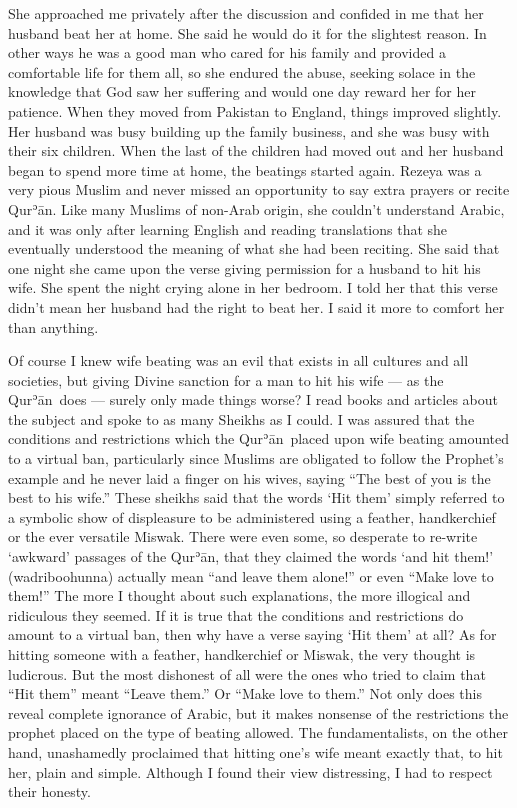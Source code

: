 \documentclass[12pt]{memoir}
\def\´{ʾ} %
\newcommand{\cor}[2]{#2} %
\def \Quran{Qur\-\´ān} %
\begin{document}
She approached me privately after the discussion
and confided in me that her husband beat her at home.
She said he would do it for the slightest reason.
In other ways he was a good man who cared for his family
and provided a comfortable life for them all, so she endured the abuse,
seeking solace in the knowledge that God saw her suffering
and would one day reward her for her patience.
When they moved from Pakistan to England, things improved slightly.
Her husband was busy building up the family business,
and she was busy with their six children.
When the last of the children had moved out
and her husband began to spend more time at home,
the beatings started again.
Rezeya was a very pious Muslim and never missed an opportunity
to say extra prayers or recite \Quran.
Like many Muslims of non-Arab origin, she couldn’t understand Arabic,
and it was only after learning English and reading translations
that she eventually understood the meaning of what she had been reciting.
She said that one night she came upon the verse
giving permission for a husband to hit his wife.
She spent the night crying alone in her bedroom.
I told her that this verse didn’t mean her husband had the right to beat her.
I said it more to comfort her than anything.

Of course I knew wife beating was an evil that exists in all cultures
and all societies, but giving Divine sanction for a man to hit his wife —
as the \Quran\ does — surely only made things worse?
I read books and articles about the subject
and spoke to as many Sheikhs as I could.
I was assured that the conditions and restrictions
which the \Quran\ placed upon wife beating amounted to a virtual ban,
particularly since Muslims are obligated to follow the Prophet’s example
and he never laid a finger on his wives\footnotemark,
saying “The best of you is the best to his wife.”
These sheikhs said that the words ‘Hit them’ simply referred
to a symbolic show of displeasure to be administered
using a feather, handkerchief or the ever versatile Miswak.
There were even some, so desperate to re-write
‘awkward’ passages of the \Quran,
that they claimed the words ‘and hit them!’ (wadriboohunna)
actually \cor{means}{mean} “and leave them alone!” or even “Make love to them!”
The more I thought about such explanations,
the more illogical and ridiculous they seemed.
If it is true that the conditions and restrictions do amount to a virtual ban,
then why have a verse saying ‘Hit them’ at all?
As for hitting someone with a feather, handkerchief or Miswak,
the very thought is ludicrous.
But the most dishonest of all were the ones who tried to claim
that “Hit them” meant “Leave them.”
Or “Make love to them.”
Not only does this reveal complete ignorance of Arabic,
but it makes nonsense of the restrictions the prophet
placed on the type of beating allowed.
The fundamentalists, on the other hand, unashamedly proclaimed
that hitting one’s wife meant exactly that, to hit her, plain and simple.
Although I found their view distressing, I had to respect their honesty.
\end{document}
